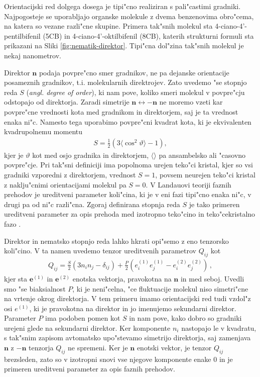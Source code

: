 \documentclass[12pt,twoside,openright,final]{report}
\newcommand{\angl}[1]{(\textit{angl. #1})}
\begin{document}
Orientacijski red dolgega dosega je tipi"cno realiziran s pali"castimi gradniki. 
Najpogosteje se uporabljajo organske molekule z dvema benzenovima obro"cema, na katera so vezane razli"cne skupine. 
Primera tak"snih molekul sta 4-ciano-4'-pentilbifenil (5CB) in 4-ciano-4'-oktilbifenil (8CB), katerih strukturni formuli sta prikazani na Sliki \ref{fig:nematik-direktor}. 
Tipi"cna dol"zina tak"snih molekul je nekaj nanometrov. 

Direktor $\mathbf{n}$ podaja povpre"cno smer gradnikov, ne pa dejanske orientacije posameznih gradnikov, t.i. molekularnih direktrojev. 
Zato uvedemo "se stopnjo reda $S$ \angl{degree of order}, ki nam pove, koliko smeri molekul v povpre"cju odstopajo od direktorja. 
Zaradi simetrije $\mathbf{n} \leftrightarrow -\mathbf{n}$ ne moremo vzeti kar povpre"cne vrednosti kota med gradnikom in direktorjem, saj je ta vrednost enaka ni"c. 
Namesto tega uporabimo povpre"cni kvadrat kota, ki je ekvivalenten kvadrupolnemu momentu \cite{kleman}
\begin{align}
 S = \frac{1}{2}\left(3\langle\cos^2\vartheta\rangle-1\right),
\end{align}
kjer je $\vartheta$ kot med osjo gradnika in direktorjem, $\langle\rangle$ pa ansambelsko ali "casovno povpre"cje. 
Pri tak"sni definiciji ima popolnoma urejen teko"ci kristal, kjer so vsi gradniki vzporedni z direktorjem, vrednost $S=1$, povsem neurejen teko"ci kristal z naklju"cnimi orientacijami molekul pa $S=0$. 
V Landauovi teoriji faznih prehodov je ureditveni parameter koli"cina, ki je v eni fazi tipi"cno enaka ni"c, v drugi pa od ni"c razli"cna. 
Zgoraj definirana stopnja reda $S$ je tako primeren ureditveni parameter za opis prehoda med izotropno teko"cino in teko"cekristalno fazo \cite{degennes}. 

Direktor in nematsko stopnjo reda lahko hkrati opi"semo z eno tenzorsko koli"cino. V ta namen uvedemo tenzor ureditvenih parametrov $Q_{ij}$ kot
\begin{align}
  Q_{ij} = \frac{S}{2}(3n_i n_j - \delta_{ij}) + \frac{P}{2}(e^{(1)}_i e^{(1)}_j - e^{(2)}_i e^{(2)}_j)\,,
\end{align}
kjer sta $\mathbf{e}^{(1)}$ in $\mathbf{e}^{(2)}$ enotska vektorja, pravokotna na $\mathbf{n}$ in med seboj. 
Uvedli smo "se biaksialnost $P$, ki je neni"celna, "ce fluktuacije molekul niso simetri"cne na vrtenje okrog direktorja. 
V tem primeru imamo orientacijski red tudi vzdol"z osi $e^{(1)}$, ki je pravokotna na direktor in jo imenujemo sekundarni direktor. 
Parameter $P$ ima podoben pomen kot $S$ in nam pove, kako dobro so gradniki urejeni glede na sekundarni direktor. 
Ker komponente $n_i$ nastopajo le v kvadratu, s tak"snim zapisom avtomatsko upo"stevamo simetrijo direktorja, saj zamenjava $\mathbf{n}$ z $-\mathbf{n}$ tenzorja $Q_{ij}$ ne spremeni. 
Ker je $\mathbf{n}$ enotski vektor, je tenzor $Q_{ij}$ brezsleden, zato so v izotropni snovi vse njegove komponente enake 0 in je primeren ureditveni parameter za opis faznih prehodov. 
\end{document}

